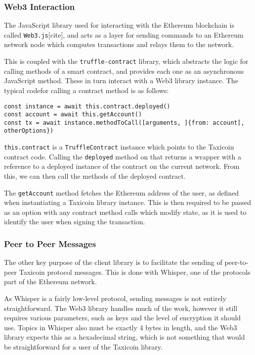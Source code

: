 \subsubsection{Web3 Interaction}

The JavaScript library used for interacting with the Ethereum blockchain is called \lstinline{Web3.js}[cite], and acts as a layer for sending commands to an Ethereum network node which computes transactions and relays them to the network.

This is coupled with the \lstinline{truffle-contract} library, which abstracts the logic for calling methods of a smart contract, and provides each one as an asynchronous JavaScript method. These in turn interact with a Web3 library instance. The typical code\footnotemark for calling a contract method is as follows:


\begin{lstlisting}
const instance = await this.contract.deployed()
const account = await this.getAccount()
const tx = await instance.methodToCall([arguments, ]{from: account[, otherOptions})
\end{lstlisting}

\lstinline{this.contract} is a \lstinline{TruffleContract} instance which points to the Taxicoin contract code. Calling the \lstinline{deployed} method on that returns a wrapper with a reference to a deployed instance of the contract on the current network. From this, we can then call the methods of the deployed contract.

The \lstinline{getAccount} method fetches the Ethereum address of the user, as defined when instantiating a Taxicoin library instance. This is then required to be passed as an option with any contract method calls which modify state, as it is used to identify the user when signing the transaction.

\subsubsection{Peer to Peer Messages}

The other key purpose of the client library is to facilitate the sending of peer-to-peer Taxicoin protocol messages. This is done with Whisper, one of the protocols part of the Ethereum network.

As Whisper is a fairly low-level protocol, sending messages is not entirely straightforward. The Web3 library handles much of the work, however it still requires various parameters, such as keys and the level of encryption it should use. Topics in Whisper also must be exactly 4 bytes in length, and the Web3 library expects this as a hexadecimal string, which is not something that would be straightforward for a user of the Taxicoin library.

